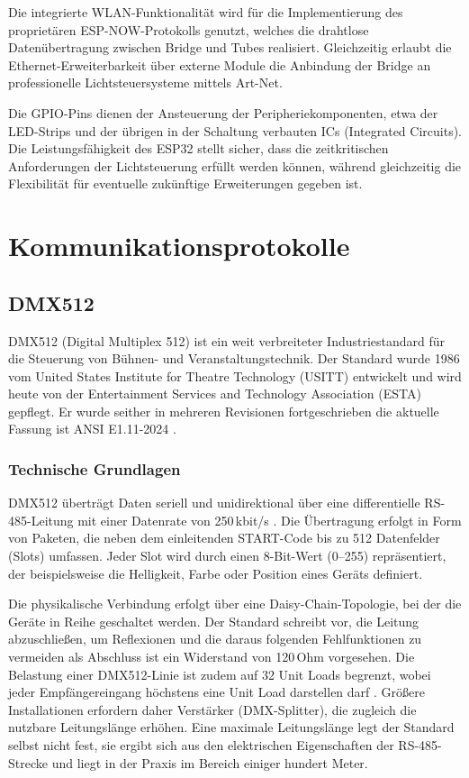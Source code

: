 Die integrierte WLAN-Funktionalität wird für die Implementierung des proprietären 
ESP-NOW-Protokolls genutzt, welches die drahtlose Datenübertragung zwischen Bridge und 
Tubes realisiert. Gleichzeitig erlaubt die Ethernet-Erweiterbarkeit über externe Module 
die Anbindung der Bridge an professionelle Lichtsteuersysteme mittels Art-Net.

Die GPIO-Pins dienen der Ansteuerung der Peripheriekomponenten, etwa der LED-Strips und 
der übrigen in der Schaltung verbauten ICs (Integrated Circuits).
Die Leistungsfähigkeit des ESP32 stellt sicher, dass die zeitkritischen Anforderungen der Lichtsteuerung erfüllt werden können, 
während gleichzeitig die Flexibilität für eventuelle zukünftige Erweiterungen gegeben ist.

\section{Kommunikationsprotokolle}
\label{sec:kommunikationsprotokolle}

\subsection{DMX512}
\label{subsec:dmx512}

DMX512 (Digital Multiplex 512) ist ein weit verbreiteter Industriestandard für die
Steuerung von Bühnen- und Veranstaltungstechnik. Der Standard wurde 1986 vom United 
States Institute for Theatre Technology (USITT) entwickelt und wird heute von der 
Entertainment Services and Technology Association (ESTA) gepflegt. Er wurde seither in 
mehreren Revisionen fortgeschrieben die aktuelle Fassung ist ANSI E1.11-2024 
\cite{ANSI_E1.11_2024}.

\subsubsection{Technische Grundlagen}
\label{subsubsec:dmx512-technik}

DMX512 überträgt Daten seriell und unidirektional über eine differentielle
RS-485-Leitung mit einer Datenrate von 250\,kbit/s \cite{ANSI_E1.11_2024}. Die
Übertragung erfolgt in Form von Paketen, die neben dem einleitenden START-Code bis zu
512 Datenfelder (Slots) umfassen. Jeder Slot wird durch einen 8-Bit-Wert (0--255)
repräsentiert, der beispielsweise die Helligkeit, Farbe oder Position eines Geräts
definiert.

Die physikalische Verbindung erfolgt über eine Daisy-Chain-Topologie, bei der die Geräte
in Reihe geschaltet werden. Der Standard schreibt vor, die Leitung abzuschließen, um
Reflexionen und die daraus folgenden Fehlfunktionen zu vermeiden als Abschluss ist ein
Widerstand von 120\,Ohm vorgesehen. Die Belastung einer DMX512-Linie ist zudem auf 32
Unit Loads begrenzt, wobei jeder Empfängereingang höchstens eine Unit Load darstellen
darf \cite{ANSI_E1.11_2024}. Größere Installationen erfordern daher Verstärker
(DMX-Splitter), die zugleich die nutzbare Leitungslänge erhöhen. Eine maximale
Leitungslänge legt der Standard selbst nicht fest, sie ergibt sich aus den elektrischen
Eigenschaften der RS-485-Strecke und liegt in der Praxis im Bereich einiger hundert
Meter.

